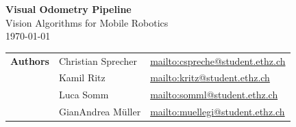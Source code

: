 \documentclass{article}
\begin{document}
%



\begin{titlepage}
\begin{center}
\setlength{\parindent}{0pt}	 \centering
\Huge{\bfseries Visual Odometry Pipeline} \\ [2.cm]
\large Vision Algorithms for Mobile Robotics \\	[1.5cm]
\large \today\\


\vspace*{\fill}

\begin{tabular} {r l l} \midrule
\bfseries{Authors} &Christian Sprecher&\url{mailto:cspreche@student.ethz.ch}\\
&Kamil Ritz&\url{mailto:kritz@student.ethz.ch}\\
&Luca Somm&\url{mailto:somml@student.ethz.ch}\\
&GianAndrea Müller&\url{mailto:muellegi@student.ethz.ch}\\
\midrule
\end {tabular}
\end{center}
\end{titlepage}



\setcounter{page}{1}
\pagestyle{fancy}
\fancyhf{}
\rfoot{\thepage}

\end{document}
